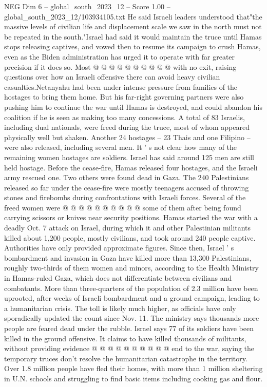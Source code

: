 \begin{textsample}{NEG Dim 6 – global\_south\_2023\_12 – Score 1.00 – global\_south\_2023\_12/103934105.txt}
He said Israeli leaders understood that"the massive levels of civilian life and displacement scale we saw in the north must not be repeated in the south."Israel had said it would maintain the truce until Hamas stops releasing captives, and vowed then to resume its campaign to crush Hamas, even as the Biden administration has urged it to operate with far greater precision if it does so.
Most @ @ @ @ @ @ @ @ @ @ with no exit, raising questions over how an Israeli offensive there can avoid heavy civilian casualties.Netanyahu had been under intense pressure from families of the hostages to bring them home.
But his far-right governing partners were also pushing him to continue the war until Hamas is destroyed, and could abandon his coalition if he is seen as making too many concessions.
A total of 83 Israelis, including dual nationals, were freed during the truce, most of whom appeared physically well but shaken.
Another 24 hostages -- 23 Thais and one Filipino -- were also released, including several men.
It ' s not clear how many of the remaining women hostages are soldiers.
Israel has said around 125 men are still held hostage.
Before the cease-fire, Hamas released four hostages, and the Israeli army rescued one.
Two others were found dead in Gaza.
The 240 Palestinians released so far under the cease-fire were mostly teenagers accused of throwing stones and firebombs during confrontations with Israeli forces.
Several of the freed women were @ @ @ @ @ @ @ @ @ @ some of them after being found carrying scissors or knives near security positions.
Hamas started the war with a deadly Oct. 7 attack on Israel, during which it and other Palestinian militants killed about 1,200 people, mostly civilians, and took around 240 people captive.
Authorities have only provided approximate figures.
Since then, Israel ' s bombardment and invasion in Gaza have killed more than 13,300 Palestinians, roughly two-thirds of them women and minors, according to the Health Ministry in Hamas-ruled Gaza, which does not differentiate between civilians and combatants.
More than three-quarters of the population of 2.3 million have been uprooted, after weeks of Israeli bombardment and a ground campaign, leading to a humanitarian crisis.
The toll is likely much higher, as officials have only sporadically updated the count since Nov. 11.
The ministry says thousands more people are feared dead under the rubble.
Israel says 77 of its soldiers have been killed in the ground offensive.
It claims to have killed thousands of militants, without providing evidence @ @ @ @ @ @ @ @ @ @ end to the war, saying the temporary truces don't resolve the humanitarian catastrophe in the territory.
Over 1.8 million people have fled their homes, with more than 1 million sheltering in U.N. schools and struggling to find basic items including cooking gas and flour.

\end{textsample}

